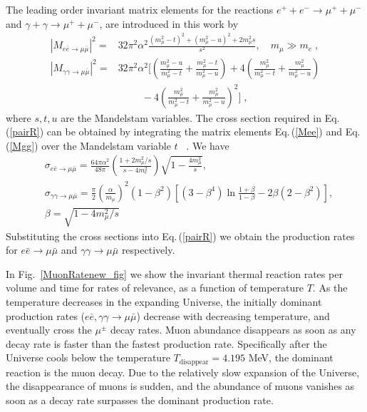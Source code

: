 The leading order invariant matrix elements for the reactions $e^++e^-\to\mu^++\mu^-$ and $\gamma+\gamma\to\mu^++\mu^-$, are introduced in this work by \cite{Kuznetsova:2008jt}
\begin{align}\label{Mee}
|M_{e\bar e\to\mu\bar\mu}|^2=&32\pi^2\alpha^2\frac{(m_\mu^2-t)^2+(m_\mu^2-u)^2+2m_\mu^2s}{s^2},\quad m_\mu\gg m_e\;,\\[0.2cm]
\label{Mgg}
|M_{\gamma\gamma\to\mu\bar\mu}|^2=&32\pi^2\alpha^2\bigg[\left(\frac{m_\mu^2-u}{m_\mu^2-t}+\frac{m_\mu^2-t}{m_\mu^2-u}\right)+4\left(\frac{m_\mu^2}{m_\mu^2-t}+\frac{m_\mu^2}{m^2_\mu-u}\right)\\[0.1cm]  \nonumber
&\hspace{1cm}-4\left(\frac{m_\mu^2}{m^2_\mu-t}+\frac{m^2_\mu}{m^2_\mu-u}\right)^2\bigg]\;,
\end{align}
 where $s, t, u$ are the Mandelstam variables. The cross section required in Eq.\,(\ref{pairR}) can be obtained by integrating the matrix elements Eq.\,(\ref{Mee}) and Eq.\,(\ref{Mgg}) over the Mandelstam variable $t$ ~\cite{PhysRevC.82.035203}. We have
\begin{align}
&\sigma_{e\bar e\to\mu\bar\mu} 
=\frac{64\pi\alpha^2}{48\pi}\left(\frac{1+2m^2_\mu/s}{s-4m_e^2}\right)\sqrt{1-\frac{4m^2_\mu}{s}},\\
&\sigma_{\gamma\gamma\to\mu\bar\mu}=\frac{\pi}{2}\left(\frac{\alpha}{m_\mu}\right)^2(1-\beta^2)\left[(3-\beta^4)\ln\frac{1+\beta}{1-\beta}-2\beta(2-\beta^2)\right],\\
&\beta=\sqrt{1-4m^2_\mu/s}
\end{align}
Substituting the cross sections into Eq.\,(\ref{pairR}) we obtain the production rates for $e\bar e\to\mu\bar\mu$ and $\gamma\gamma\to\mu\bar\mu$ respectively.

 
In Fig.~\ref{MuonRatenew_fig} we show the invariant thermal reaction rates per volume and time for rates of relevance, as a function of temperature $T$.
As the temperature decreases in the expanding Universe, the initially dominant production rates ($e\bar e,\gamma\gamma\to\mu\bar\mu$) decrease with decreasing temperature, and eventually cross the $\mu^\pm$ decay rates. 
Muon abundance disappears as soon as any decay rate is faster than the fastest production rate. Specifically after the Universe cools below the temperature $T_\mathrm{disappear}=4.195$ MeV, the dominant reaction is the muon decay. Due to the relatively slow expansion of the Universe, the disappearance of muons is sudden, and the abundance of muons vanishes as soon as a decay rate surpasses the dominant production rate.
 

